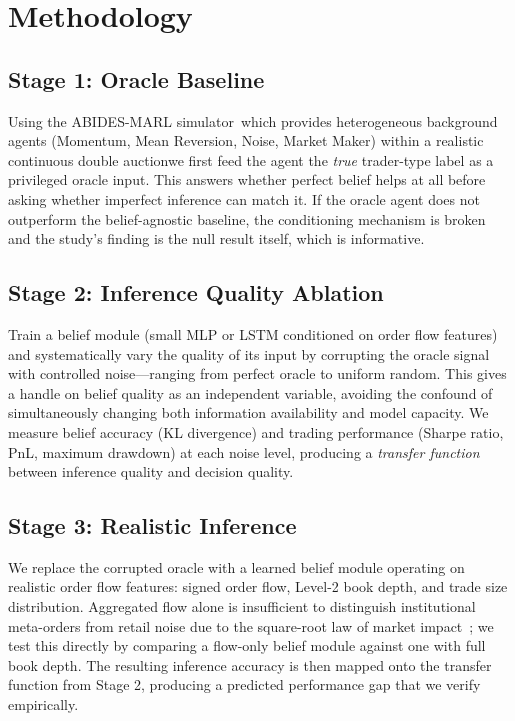 \documentclass[8pt, a4paper]{article}
\begin{document}
{\vspace{-10pt}
\section{Methodology}

\subsection{Stage 1: Oracle Baseline}

Using the ABIDES-MARL simulator~\cite{abides2019}\textemdash which provides heterogeneous background agents (Momentum, Mean Reversion, Noise, Market Maker) within a realistic continuous double auction\textemdash we first feed the agent the \textit{true} trader-type label as a privileged oracle input. This answers whether perfect belief helps at all before asking whether imperfect inference can match it. If the oracle agent does not outperform the belief-agnostic baseline, the conditioning mechanism is broken and the study's finding is the null result itself, which is informative.

\vspace{}

\subsection{Stage 2: Inference Quality Ablation}

Train a belief module (small MLP or LSTM conditioned on order flow features) and systematically vary the quality of its input by corrupting the oracle signal with controlled noise---ranging from perfect oracle to uniform random. This gives a handle on belief quality as an independent variable, avoiding the confound of simultaneously changing both information availability and model capacity. We measure belief accuracy (KL divergence) and trading performance (Sharpe ratio, PnL, maximum drawdown) at each noise level, producing a \textit{transfer function} between inference quality and decision quality.

\subsection{Stage 3: Realistic Inference}

We replace the corrupted oracle with a learned belief module operating on realistic order flow features: signed order flow, Level-2 book depth, and trade size distribution. Aggregated flow alone is insufficient to distinguish institutional meta-orders from retail noise due to the square-root law of market impact~\cite{bershova2013}; we test this directly by comparing a flow-only belief module against one with full book depth. The resulting inference accuracy is then mapped onto the transfer function from Stage 2, producing a predicted performance gap that we verify empirically.

}
\end{document}
